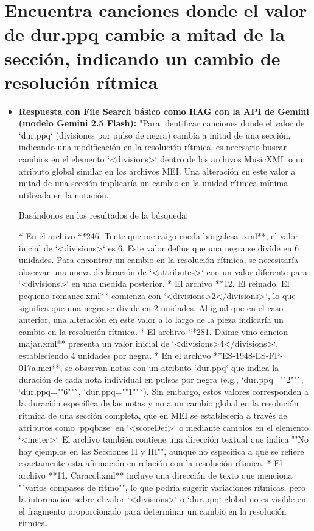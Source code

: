 \section{Encuentra canciones donde el valor de dur.ppq cambie a mitad de la sección, indicando un cambio de resolución rítmica}
\begin{itemize}
    \item \textbf{Respuesta con File Search básico como RAG con la API de Gemini (modelo Gemini 2.5 Flash):} "Para identificar canciones donde el valor de `dur.ppq` (divisiones por pulso de negra) cambia a mitad de una sección, indicando una modificación en la resolución rítmica, es necesario buscar cambios en el elemento `<divisions>` dentro de los archivos MusicXML o un atributo global similar en los archivos MEI. Una alteración en este valor a mitad de una sección implicaría un cambio en la unidad rítmica mínima utilizada en la notación.

Basándonos en los resultados de la búsqueda:

*   En el archivo **246. Tente que me caigo rueda burgalesa .xml**, el valor inicial de `<divisions>` es 6. Este valor define que una negra se divide en 6 unidades. Para encontrar un cambio en la resolución rítmica, se necesitaría observar una nueva declaración de `<attributes>` con un valor diferente para `<divisions>` en una medida posterior.
*   El archivo **12. El reinado. El pequeno romance.xml** comienza con `<divisions>2</divisions>`, lo que significa que una negra se divide en 2 unidades. Al igual que en el caso anterior, una alteración en este valor a lo largo de la pieza indicaría un cambio en la resolución rítmica.
*   El archivo **281. Daime vino cancion majar.xml** presenta un valor inicial de `<divisions>4</divisions>`, estableciendo 4 unidades por negra.
*   En el archivo **ES-1948-ES-FP-017a.mei**, se observan notas con un atributo `dur.ppq` que indica la duración de cada nota individual en pulsos por negra (e.g., `dur.ppq=""2""`, `dur.ppq=""6""`, `dur.ppq=""1""`). Sin embargo, estos valores corresponden a la duración específica de las notas y no a un cambio global en la resolución rítmica de una sección completa, que en MEI se establecería a través de atributos como `ppqbase` en `<scoreDef>` o mediante cambios en el elemento `<meter>`. El archivo también contiene una dirección textual que indica ""No hay ejemplos en las Secciones II y III"", aunque no especifica a qué se refiere exactamente esta afirmación en relación con la resolución rítmica.
*   El archivo **11. Caracol.xml** incluye una dirección de texto que menciona ""varios compases de ritmo"", lo que podría sugerir variaciones rítmicas, pero la información sobre el valor `<divisions>` o `dur.ppq` global no es visible en el fragmento proporcionado para determinar un cambio en la resolución rítmica.


\end{itemize}
